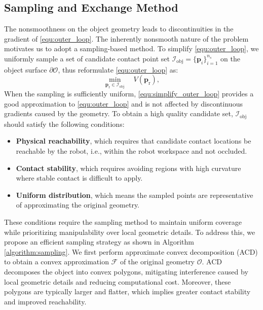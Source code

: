 \subsection{Sampling and Exchange Method}\label{sec:sampling&exchange}
The nonsmoothness on the object geometry leads to discontinuities in the gradient of \eqref{equ:outer_loop}. The inherently nonsmooth nature of the problem motivates us to adopt a sampling-based method. To simplify \eqref{equ:outer_loop}, we uniformly sample a set of candidate contact point set $\mathcal{I}_{\text{obj}} = \{\boldsymbol{p}_i\}_{i=1}^{n_s}$ on the object surface $\partial \mathcal{O}$, thus reformulate \eqref{equ:outer_loop} as:
\begin{equation}
 \min_{\boldsymbol{p}_{\text{r}} \in \mathcal{I}_{\text{obj}}}
 \quad V(\boldsymbol{p}_{\text{r}}),\label{equ:simplify_outer_loop}
\end{equation}
\noindent When the sampling is sufficiently uniform, \eqref{equ:simplify_outer_loop} provides a good approximation to \eqref{equ:outer_loop} and is not affected by discontinuous gradients caused by the geometry. To obtain a high quality candidate set, $\mathcal{I}_{\text{obj}}$ should satisfy the following conditions:
\begin{itemize}
 \item \textbf{Physical reachability}, which requires that candidate contact locations be reachable by the robot, i.e., within the robot workspace and not occluded.
 \item \textbf{Contact stability}, which requires avoiding regions with high curvature where stable contact is difficult to apply.
 \item \textbf{Uniform distribution}, which means the sampled points are representative of approximating the original geometry.
\end{itemize}
These conditions require the sampling method to maintain uniform coverage while prioritizing manipulability over local geometric details. To address this, we propose an efficient sampling strategy as shown in Algorithm \ref{algorithm:sampling}. We first perform approximate convex decomposition (ACD) \cite{lien2007approximate} to obtain a convex approximation $\mathcal{F}$ of the original geometry $\mathcal{O}$. ACD decomposes the object into convex polygons, mitigating interference caused by local geometric details and reducing computational cost. Moreover, these polygons are typically larger and flatter, which implies greater contact stability and improved reachability.

